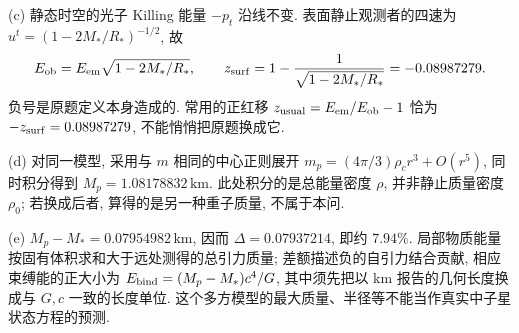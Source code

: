 \begin{solution}
(c) 静态时空的光子 Killing 能量 $-p_t$ 沿线不变. 表面静止观测者的四速为 $u^t=(1-2M_*/R_*)^{-1/2}$, 故
\[
E_{\rm ob}=E_{\rm em}\sqrt{1-2M_*/R_*},\qquad
z_{\rm surf}=1-\frac1{\sqrt{1-2M_*/R_*}}=-0.08987279.
\]
负号是原题定义本身造成的. 常用的正红移 $z_{\rm usual}=E_{\rm em}/E_{\rm ob}-1$ 恰为 $-z_{\rm surf}=0.08987279$, 不能悄悄把原题换成它.

(d) 对同一模型, 采用与 $m$ 相同的中心正则展开 $m_p=(4\pi/3)\rho_cr^3+O(r^5)$, 同时积分得到 $M_p=1.08178832\,\mathrm{km}$. 此处积分的是总能量密度 $\rho$, 并非静止质量密度 $\rho_0$; 若换成后者, 算得的是另一种重子质量, 不属于本问.

(e) $M_p-M_*=0.07954982\,\mathrm{km}$, 因而 $\Delta=0.07937214$, 即约 $7.94\%$. 局部物质能量按固有体积求和大于远处测得的总引力质量; 差额描述负的自引力结合贡献, 相应束缚能的正大小为 $E_{\rm bind}=(M_p-M_*)c^4/G$, 其中须先把以 km 报告的几何长度换成与 $G,c$ 一致的长度单位. 这个多方模型的最大质量、半径等不能当作真实中子星状态方程的预测.
\end{solution}

